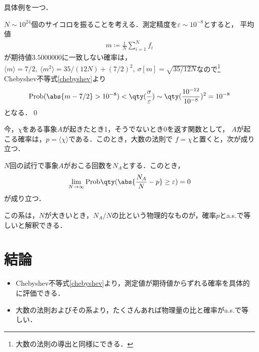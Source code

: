   具体例を一つ．
  \begin{eg}
    $N\sim10^{24}$個のサイコロを振ることを考える．測定精度を$\varepsilon\sim10^{-8}$とすると，
    平均値
    \begin{align}
      m\coloneqq \frac{1}{N}\sum_{i=1}^{N}f_i
    \end{align}
    が期待値$3.5000000$に一致しない確率は，$\langle m \rangle = 7/2,\ \langle m^2 \rangle = 35 / (12 N) + (7/2)^2,\ \sigma[m] = \sqrt{35/12N}$なので\footnote{大数の法則の導出と同様にできる．}
    Chebyshev不等式\eqref{chebyshev}より
    \begin{align}
      \mathrm{Prob}(\abs{m-7/2} > 10^{-8}) < \qty(\frac{\sigma}{\varepsilon})\sim \qty(\frac{10^{-12}}{10^{-8}})^{2}= 10^{-8}
    \end{align}
    となる．\qed
  \end{eg}
  今，$\chi$をある事象$A$が起きたとき1，そうでないとき0を返す関数として，
  $A$が起こる確率は，$p = \langle \chi \rangle$である．このとき，大数の法則で
  $f=\chi$と置くと，次が成り立つ．
  \begin{cor}
    $N$回の試行で事象$A$がおこる回数を$N_A$とする．このとき，
    \begin{align}
      \lim_{N\to\infty}\mathrm{Prob}\qty(\abs{\frac{N_A}{N}-p}\geq \varepsilon ) = 0  
    \end{align}
    が成り立つ．
  \end{cor}
  この系は，$N$が大きいとき，$N_A/N$の比という物理的なものが，確率$p$とa.s.で等しいと解釈できる．
\section{結論}
  \begin{itemize}
    \item Chebyshev不等式\eqref{chebyshev}より，測定値が期待値からずれる確率を具体的に評価できる．
    \item 大数の法則およびその系より，たくさんあれば物理量の比と確率がa.s.で等しい．
  \end{itemize}